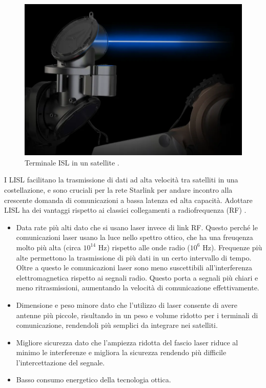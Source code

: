 \begin{figure}[htbp]
  \centering
  \includegraphics[width=0.9\linewidth]{./res/img/LISL_terminal.png}
  \caption{Terminale \ac{ISL} in un satellite \cite{mike_puchol_modeling_2022}.}
  \label{fig:starlink-terminal}
\end{figure}

I \ac{LISL} facilitano la trasmissione di dati ad alta velocità tra satelliti in una costellazione, e sono cruciali per la rete Starlink per andare incontro alla crescente domanda di comunicazioni a bassa latenza ed alta capacità.
Adottare \ac{LISL} ha dei vantaggi rispetto ai classici collegamenti a radiofrequenza (\ac{RF}) \cite{chaudhry_laser_2021}.
\begin{itemize}
  \item Data rate più alti dato che si usano laser invece di link \ac{RF}. Questo perché le comunicazioni laser usano la luce nello spettro ottico, che ha una freuqenza molto più alta (circa $10^{14}$ Hz) rispetto alle onde radio ($10^{6}$ Hz). Frequenze più alte permettono la trasmissione di più dati in un certo intervallo di tempo. Oltre a questo le comunicazioni laser sono meno suscettibili all'interferenza elettromagnetica rispetto ai segnali radio. Questo porta a segnali più chiari e meno ritrasmissioni, aumentando la velocità di comunicazione effettivamente.
  \item Dimensione e peso minore dato che l'utilizzo di laser consente di avere antenne più piccole, risultando in un peso e volume ridotto per i terminali di comunicazione, rendendoli più semplici da integrare nei satelliti.
  \item Migliore sicurezza dato che l'ampiezza ridotta del fascio laser riduce al minimo le interferenze e migliora la sicurezza rendendo più difficile l'intercettazione del segnale.
  \item Basso consumo energetico della tecnologia ottica.
\end{itemize}

